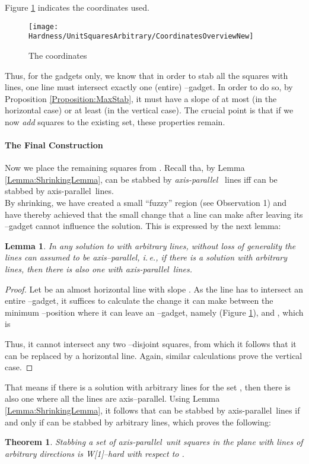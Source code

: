 \documentclass[12pt]{article}
\newtheorem{lemma}[definition]{Lemma}
\newtheorem{theorem}[definition]{Theorem}
\newcommand{\cclass}[1]{{#1}}
\newcommand{\wone}{\cclass{W[1]}}
\newcommand{\ap}{a.p.\ }
\renewcommand{\ap}{axis-parallel\ }
\begin{document}
Figure \ref{fig:CoordinatesOverviewNew} indicates the coordinates used.
\begin{figure}[ht]
	\centering
		\texttt{[image: Hardness/UnitSquaresArbitrary/CoordinatesOverviewNew]}
	\caption{The coordinates}
	\label{fig:CoordinatesOverviewNew}
\end{figure}
Thus, for the  gadgets only, we know that in order to stab all the squares with  lines, one line must intersect exactly one (entire) --gadget. In order to do so, by Proposition \ref{Proposition:MaxStab}, it must have a slope of at most  (in the horizontal case) or at least  (in the vertical case). The crucial point is  that if we now \emph{add} squares to the existing set, these properties remain.

\paragraph{The Final Construction}
Now we place the remaining squares from . Recall tha, by Lemma \ref{Lemma:ShrinkingLemma},  can be stabbed by  \textit{\ap} lines iff  can be stabbed by  \ap lines.\\
By shrinking, we have created a small ``fuzzy'' region (see Observation 1) and have thereby achieved that the small change that a line can make after leaving its --gadget cannot influence the solution. This is expressed by the next lemma:
\begin{lemma}\label{Lemma:WlogHV} In any solution to  with  arbitrary lines, without loss of generality the lines can assumed to be axis--parallel, i.\,e., if there is a solution with  arbitrary lines, then there is also one with  \ap lines. 
\end{lemma}
\begin{proof} 
Let  be an almost horizontal line with slope . As the line has to intersect an entire --gadget, it suffices to calculate the change it can make between the minimum --position where it can leave an --gadget, namely  (Figure \ref{fig:CoordinatesOverviewNew}), and , which is
 
Thus, it cannot intersect any two --disjoint squares, from which it follows that it can be replaced by a horizontal line. Again, similar calculations prove the vertical case.
\end{proof}
That means if there is a solution with arbitrary lines for the set , then there is also one where all the lines are axis--parallel.
Using Lemma \ref{Lemma:ShrinkingLemma}, it follows that  can be stabbed by  \ap lines if and only if  can be stabbed by  arbitrary lines, which proves the following: 
\begin{theorem}\label{thm:wonehardunitsquaresarbitrary} 
Stabbing a set of \ap unit squares in the plane with  lines of arbitrary directions is \wone--hard with respect to .
\end{theorem} 
\end{document}
